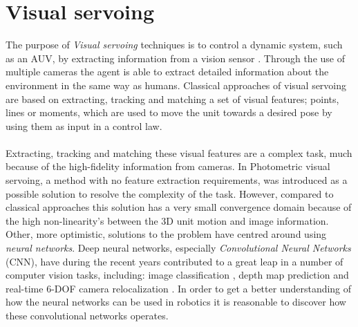 \section{Visual servoing}
The purpose of \textit{Visual servoing} techniques is to control a dynamic system, such as an AUV, by extracting information from a vision sensor \cite{Quentin}. Through the use of multiple cameras the agent is able to extract detailed information about the environment in the same way as humans. Classical approaches of visual servoing are based on extracting, tracking and matching a set of visual features; points, lines or moments, which are used to move the unit towards a desired pose by using them as input in a control law. \\\\
Extracting, tracking and matching these visual features are a complex task, much because of the high-fidelity information from cameras. In \cite{Collewet} Photometric visual servoing, a method with no feature extraction requirements, was introduced as a possible solution to resolve the complexity of the task. However, compared to classical approaches this solution has a very small convergence domain because of the high non-linearity's between the 3D unit motion and image information. Other, more optimistic, solutions to the problem have centred around using \textit{neural networks}. Deep neural networks, especially \textit{Convolutional Neural Networks} (CNN), have during the recent years contributed to a great leap in a number of computer vision tasks, including: image classification \cite{Hinton}, depth map prediction \cite{Eigen} and real-time 6-DOF camera relocalization \cite{Kendall}. In order to get a better understanding of how the neural networks can be used in robotics it is reasonable to discover how these convolutional networks operates. 
